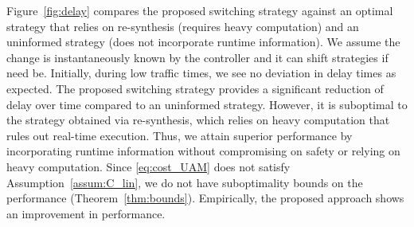 Figure~\ref{fig:delay} compares the proposed switching strategy against an optimal strategy that relies on re-synthesis (requires heavy computation) and an uninformed strategy (does not incorporate runtime information). 
 We assume the change is instantaneously known by the controller and it can shift strategies if need be.  
Initially, during low traffic times, we see no deviation in delay times as expected. The proposed switching strategy provides a significant reduction of delay over time compared to an uninformed strategy. However, it is suboptimal to the strategy obtained via re-synthesis, which relies on heavy computation that rules out real-time execution. 
 Thus, we attain superior performance by incorporating runtime information without compromising on safety or relying on heavy computation. 
Since \eqref{eq:cost_UAM} does not satisfy Assumption~\ref{assum:C_lin}, we do not have suboptimality bounds on the performance (Theorem~\ref{thm:bounds}). Empirically, the proposed approach shows an improvement in performance.
